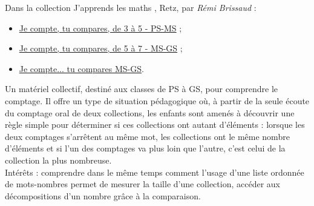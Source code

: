 \medskip


\begin{exercice*}
   Dans la collection \og J'apprends les maths \fg, Retz, par {\it Rémi Brissaud} :
   \begin{itemize}
      \item \href{http://extranet.editis.com/it-yonixweb/images/322/art/doc/4/4d22235f9031343337373530343434363934323630.pdf}{Je compte, tu compares, de 3 à 5 - PS-MS} ;
      \item \href{http://extranet.editis.com/it-yonixweb/images/322/art/doc/f/f2264616e731343337373530333832383731323539.pdf}{Je compte, tu compares, de 5 à 7 - MS-GS} ;
      \item \href{https://www.youtube.com/watch?v=8Iai1uyfaFg&feature=emb_logo}{Je compte... tu compares MS-GS}.
   \end{itemize}
   \medskip
   Un matériel collectif, destiné aux classes de PS à GS, pour comprendre le comptage. Il offre un type de situation pédagogique où, à partir de la seule écoute du comptage oral de deux collections, les enfants sont amenés à découvrir une règle simple pour déterminer si ces collections ont autant d’éléments : lorsque les deux comptages s’arrêtent au même mot, les collections ont le même nombre d’éléments et si l’un des comptages \og va plus loin \fg{} que l’autre, c’est celui de la collection la plus nombreuse. \\
   Intérêts : comprendre dans le même temps comment l’usage d’une liste ordonnée de mots-nombres permet de mesurer la taille d’une collection, accéder aux décompositions d'un nombre grâce à la comparaison.
   \begin{center}
      \qquad

\end{center}
\end{exercice*}
